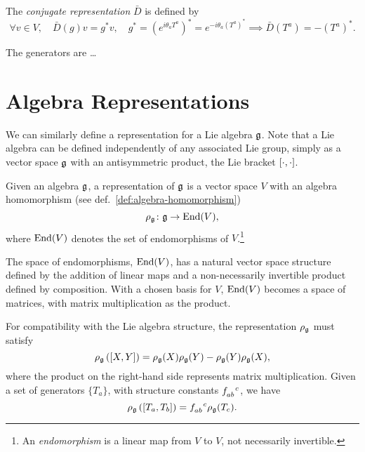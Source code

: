 \begin{definition}
    The \emph{conjugate representation} $\bar{D}$ is defined by
    \begin{equation}
        \forall v \in V, \quad \bar{D}(g)v = g^* v, \quad g^* = {\left(e^{i {\theta}_a T^a}\right)}^* = e^{-i \theta_a {(T^a)}^*} \implies \bar{D}(T^a) = - (T^a)^* .
    \end{equation}
\end{definition}

\begin{definition}
    \color{red} The generators are \dots \color{black}
\end{definition}



\section{Algebra Representations}
We can similarly define a representation for a Lie algebra $\mathfrak{g}$. Note that a Lie algebra can be defined independently of any associated Lie group, simply as a vector space $\mathfrak{g}$ with an antisymmetric product, the Lie bracket $\comm{\cdot}{\cdot}$.

\begin{definition}
    Given an algebra $\mathfrak{g}$, a representation of $\mathfrak{g}$ is a vector space $V$ with an algebra homomorphism (see def.~\ref{def:algebra-homomorphism})
    \begin{equation}
        \rho_{\mathfrak{g}} \colon \mathfrak{g} \to \textup{End}(V),
    \end{equation}
    where $\textup{End}(V)$ denotes the set of endomorphisms of $V$.\footnote{An \emph{endomorphism} is a linear map from $V$ to $V$, not necessarily invertible.}
\end{definition}

The space of endomorphisms, $\textup{End}(V)$, has a natural vector space structure defined by the addition of linear maps and a non-necessarily invertible product defined by composition. With a chosen basis for $V$, $\textup{End}(V)$ becomes a space of matrices, with matrix multiplication as the product.

For compatibility with the Lie algebra structure, the representation $\rho_{\mathfrak{g}}$ must satisfy
\begin{equation}
    \rho_\g \left( \comm{X}{Y}  \right) = \rho_\g (X) \rho_\g (Y) - \rho_\g (Y) \rho_\g (X) ,
\end{equation}
where the product on the right-hand side represents matrix multiplication. Given a set of generators $\{T_a\}$, with structure constants $\tensor{f}{_a_b^c}$, we have
\begin{equation}
    \rho_\g \left( \comm{T_a}{T_b} \right)  = \tensor{f}{_a_b^c} \rho_\g (T_c) .
\end{equation}


